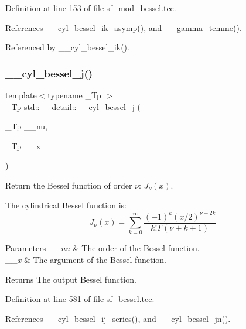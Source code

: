 Definition at line 153 of file sf\+\_\+mod\+\_\+bessel.\+tcc.



References \+\_\+\+\_\+cyl\+\_\+bessel\+\_\+ik\+\_\+asymp(), and \+\_\+\+\_\+gamma\+\_\+temme().



Referenced by \+\_\+\+\_\+cyl\+\_\+bessel\+\_\+ik().

\mbox{\label{namespacestd_1_1____detail_a9909fc0c463a7f0b9259fe02e15fce55}} 
\subsubsection{\texorpdfstring{\+\_\+\+\_\+cyl\+\_\+bessel\+\_\+j()}{\_\_cyl\_bessel\_j()}}
{\footnotesize\ttfamily template$<$typename \+\_\+\+Tp $>$ \\
\+\_\+\+Tp std\+::\+\_\+\+\_\+detail\+::\+\_\+\+\_\+cyl\+\_\+bessel\+\_\+j (\begin{DoxyParamCaption}\item[{\+\_\+\+Tp}]{\+\_\+\+\_\+nu,  }\item[{\+\_\+\+Tp}]{\+\_\+\+\_\+x }\end{DoxyParamCaption})}



Return the Bessel function of order $ \nu $\+: $ J_{\nu}(x) $. 

The cylindrical Bessel function is\+: \[ J_{\nu}(x) = \sum_{k=0}^{\infty} \frac{(-1)^k (x/2)^{\nu + 2k}}{k!\Gamma(\nu+k+1)} \]


\begin{DoxyParams}{Parameters}
{\em \+\_\+\+\_\+nu} & The order of the Bessel function. \\
\hline
{\em \+\_\+\+\_\+x} & The argument of the Bessel function. \\
\hline
\end{DoxyParams}
\begin{DoxyReturn}{Returns}
The output Bessel function. 
\end{DoxyReturn}


Definition at line 581 of file sf\+\_\+bessel.\+tcc.



References \+\_\+\+\_\+cyl\+\_\+bessel\+\_\+ij\+\_\+series(), and \+\_\+\+\_\+cyl\+\_\+bessel\+\_\+jn().

